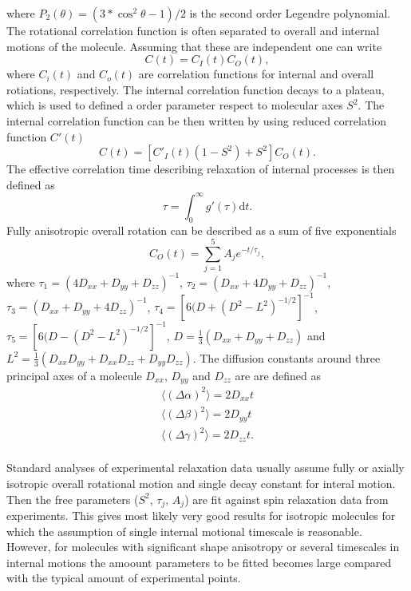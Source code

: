 \documentclass[pre,aps,floatfix,authordate1-4,twocolumn]{revtex4-1}
\begin{document}
where $P_2(\theta)=(3*\cos^2\theta-1)/2$ is the second order Legendre polynomial.
The rotational correlation function is often separated to overall and internal
motions of the molecule. Assuming that these are independent one can write
\begin{equation}
  C(t)=C_I(t)C_O(t),
\end{equation}
where $C_i(t)$ and $C_o(t)$ are correlation functions for internal and overall
rotiations, respectively. The internal correlation function decays to a plateau, which
is used to defined a order parameter respect to molecular axes $S^2$.
The internal correlation function can be then written by using
reduced correlation function $C'(t)$
\begin{equation}
  C(t)=[C'_I(t)(1-S^2)+S^2]C_O(t).
\end{equation}
The effective correlation time describing relaxation of internal
processes is then defined as
\begin{equation}
  \tau=\int_0^\infty g'(\tau) \mathrm{d}t.
\end{equation}
Fully anisotropic overall rotation can be described as a sum of five exponentials
\begin{equation}
  C_O(t)=\sum_{j=1}^5 A_j e^{-t/\tau_j},
\end{equation}
where
$\tau_1=(4D_{xx}+D_{yy}+D_{zz})^{-1}$,
$\tau_2=(D_{xx}+4D_{yy}+D_{zz})^{-1}$,
$\tau_3=(D_{xx}+D_{yy}+4D_{zz})^{-1}$,
$\tau_4=[6(D+(D^2-L^2)^{-1/2}]^{-1}$,
$\tau_5=[6(D-(D^2-L^2)^{-1/2}]^{-1}$,
$D=\frac{1}{3}(D_{xx}+D_{yy}+D_{zz})$ and 
$L^2=\frac{1}{3}(D_{xx}D_{yy}+D_{xx}D_{zz}+D_{yy}D_{zz})$.
The diffusion constants around
three principal axes of a molecule
$D_{xx}$, $D_{yy}$ and $D_{zz}$ are 
are defined as 
\begin{equation}
\begin{aligned}
  \langle (\Delta \alpha)^2 \rangle = 2 D_{xx} t \\
  \langle (\Delta \beta)^2 \rangle = 2 D_{yy} t \\
  \langle (\Delta \gamma)^2 \rangle = 2 D_{zz} t. \\
\end{aligned}
\end{equation}


Standard analyses of experimental relaxation data usually assume
fully or axially isotropic overall rotational motion and single
decay constant for interal motion. Then the free parameters
($S^2$, $\tau_j$, $A_j$) are fit against spin relaxation data
from experiments. This gives most likely very good results for
isotropic molecules for which the assumption of single internal
motional timescale is reasonable. However, for molecules with
significant shape anisotropy or several timescales in internal
motions the amoount parameters to be fitted becomes large compared
with the typical amount of experimental points.
\end{document}
